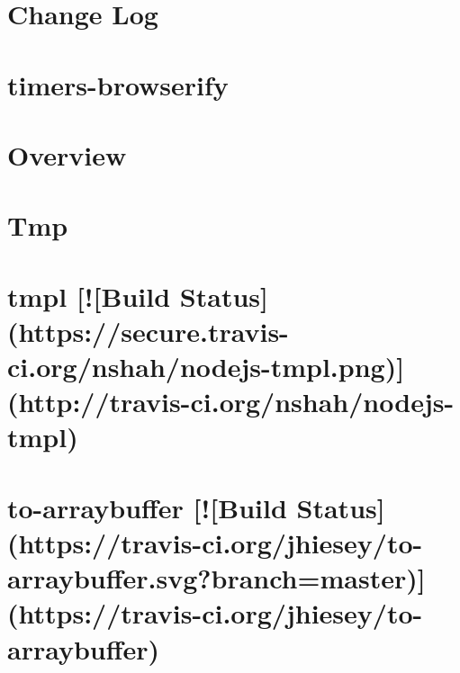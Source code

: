 \documentclass[twoside]{book}
\newcommand{\+}{\discretionary{\mbox{\scriptsize$\hookleftarrow$}}{}{}}
\begin{document}
\chapter{Change Log}
\label{md__c_1_workspace_demo_src_main_script_node_modules_timers-browserify__c_h_a_n_g_e_l_o_g}

\chapter{timers-\/browserify}
\label{md__c_1_workspace_demo_src_main_script_node_modules_timers-browserify__l_i_c_e_n_s_e}

\chapter{Overview}
\label{md__c_1_workspace_demo_src_main_script_node_modules_timers-browserify__r_e_a_d_m_e}

\chapter{Tmp}
\label{md__c_1_workspace_demo_src_main_script_node_modules_tmp__r_e_a_d_m_e}

\chapter{tmpl \mbox{[}!\mbox{[}Build Status\mbox{]}(https\+://secure.travis-\/ci.org/nshah/nodejs-\/tmpl.png)\mbox{]}(http\+://travis-\/ci.org/nshah/nodejs-\/tmpl)}
\label{md__c_1_workspace_demo_src_main_script_node_modules_tmpl_readme}

\chapter{to-\/arraybuffer \mbox{[}!\mbox{[}Build Status\mbox{]}(https\+://travis-\/ci.org/jhiesey/to-\/arraybuffer.svg?branch=master)\mbox{]}(https\+://travis-\/ci.org/jhiesey/to-\/arraybuffer)}
\label{md__c_1_workspace_demo_src_main_script_node_modules_to-arraybuffer__r_e_a_d_m_e}

\end{document}
